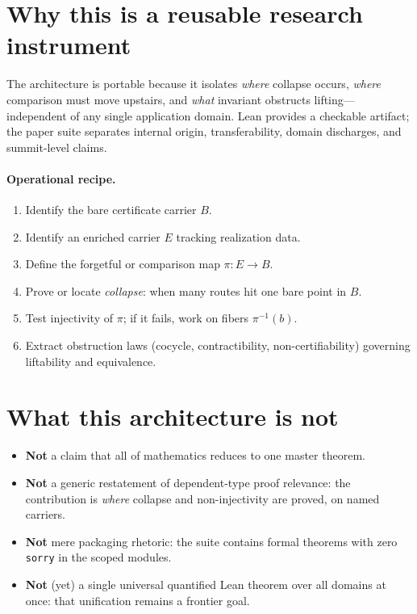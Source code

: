 \documentclass[11pt]{article}
\begin{document}
\section{Why this is a reusable research instrument}

The architecture is portable because it isolates \emph{where} collapse occurs, \emph{where}
comparison must move upstairs, and \emph{what} invariant obstructs lifting---independent
of any single application domain. Lean provides a checkable artifact; the paper suite
separates internal origin, transferability, domain discharges, and summit-level claims.

\paragraph{Operational recipe.}
\begin{enumerate}[label=\arabic*., leftmargin=2em]
  \item Identify the bare certificate carrier $B$.
  \item Identify an enriched carrier $E$ tracking realization data.
  \item Define the forgetful or comparison map $\pi : E \to B$.
  \item Prove or locate \emph{collapse}: when many routes hit one bare point in $B$.
  \item Test injectivity of $\pi$; if it fails, work on fibers $\pi^{-1}(b)$.
  \item Extract obstruction laws (cocycle, contractibility, non-certifiability) governing
    liftability and equivalence.
\end{enumerate}

\section{What this architecture is not}

\begin{itemize}[leftmargin=2em]
  \item \textbf{Not} a claim that all of mathematics reduces to one master theorem.
  \item \textbf{Not} a generic restatement of dependent-type proof relevance: the
    contribution is \emph{where} collapse and non-injectivity are proved, on named carriers.
  \item \textbf{Not} mere packaging rhetoric: the suite contains formal theorems with
    zero \texttt{sorry} in the scoped modules.
  \item \textbf{Not} (yet) a single universal quantified Lean theorem over all domains at
    once: that unification remains a frontier goal.
\end{itemize}
\end{document}
